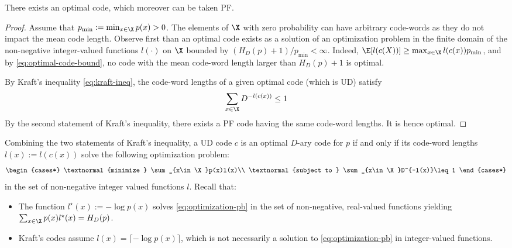 \documentclass[toc]{../cs-classes/cs-classes}
\begin{document}
\begin{property}
    \label{prop:optimal-code-exists}
    There exists an optimal code, which moreover can be taken PF.
\end{property}
\begin{proof}
    Assume that $p_{\min}:=\min_{x\in\X}p(x)>0$. The elements of $\X$ with zero probability can have arbitrary code-words as they do not impact the mean code length. Observe first than an optimal code exists as a solution of an optimization problem in the finite domain of the non-negative integer-valued functions $l(\cdot)$ on $\X$ bounded by $(H_D(p)+1)/p_{\min}<\infty$. Indeed, $\E[l(c(X))]\geq \max_{x\in\X} l(c(x))p_{\min}$, and by \eqref{eq:optimal-code-bound}, no code with the mean code-word length larger than $H_D(p)+1$ is optimal.

    By Kraft's inequality \eqref{eq:kraft-ineq}, the code-word lengths of a given optimal code (which is UD) satisfy
    \begin{equation*}
        \sum_{x\in\X}D^{-l(c(x))}\leq 1
    \end{equation*}
    By the second statement of Kraft's inequality, there exists a PF code having the same code-word lengths. It is hence optimal.
\end{proof}

\begin{remark}
    Combining the two statements of Kraft's inequality, a UD code $c$ is an optimal $D$-ary code for $p$ if and only if its code-word lengths $l(x):=l(c(x))$ solve the following optimization problem:
    \begin{equation}
        \label{eq:optimization-pb}
        \begin{cases*}
            \textnormal{minimize } \sum_{x\in\X}p(x)l(x)\\
            \textnormal{subject to } \sum_{x\in\X}D^{-l(x)}\leq 1
        \end{cases*}
    \end{equation}
    in the set of non-negative integer valued functions $l$. Recall that:
    \begin{itemize}
        \item The function $l^\star(x):=-\log p(x)$ solves \eqref{eq:optimization-pb} in the set of non-negative, real-valued functions yielding $\sum_{x\in\X}p(x)l^\star(x)=H_D(p)$.
        \item Kraft's codes assume $l(x)=\lceil -\log p(x)\rceil$, which is not necessarily a solution to \eqref{eq:optimization-pb} in integer-valued functions.
    \end{itemize}
\end{remark}
\end{document}

